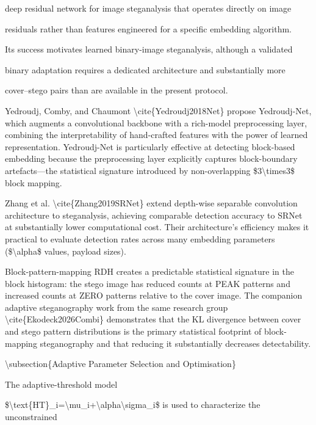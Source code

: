 \documentclass[a4paper,fleqn]{cas-dc}
\newenvironment{RevisionDeletion}{%
  \par\begingroup\color{revisionred}\footnotesize\ttfamily
  \setlength{\parindent}{0pt}\setlength{\parskip}{1pt}\obeyspaces
}{\par\endgroup}
\begin{document}
\begin{RevisionDeletion}
deep residual network for image steganalysis that operates directly on image\par
residuals rather than features engineered for a specific embedding algorithm.\par
Its success motivates learned binary-image steganalysis, although a validated\par
binary adaptation requires a dedicated architecture and substantially more\par
cover--stego pairs than are available in the present protocol.\par
\par
Yedroudj, Comby, and Chaumont \textbackslash{}cite\{Yedroudj2018Net\} propose Yedroudj-Net, which augments a convolutional backbone with a rich-model preprocessing layer, combining the interpretability of hand-crafted features with the power of learned representation. Yedroudj-Net is particularly effective at detecting block-based embedding because the preprocessing layer explicitly captures block-boundary artefacts---the statistical signature introduced by non-overlapping \$3\textbackslash{}times3\$ block mapping.\par
\par
Zhang et al. \textbackslash{}cite\{Zhang2019SRNet\} extend depth-wise separable convolution architecture to steganalysis, achieving comparable detection accuracy to SRNet at substantially lower computational cost. Their architecture's efficiency makes it practical to evaluate detection rates across many embedding parameters (\$\textbackslash{}alpha\$ values, payload sizes).\par
\par
Block-pattern-mapping RDH creates a predictable statistical signature in the block histogram: the stego image has reduced counts at PEAK patterns and increased counts at ZERO patterns relative to the cover image. The companion adaptive steganography work from the same research group \textbackslash{}cite\{Ekodeck2026Combi\} demonstrates that the KL divergence between cover and stego pattern distributions is the primary statistical footprint of block-mapping steganography and that reducing it substantially decreases detectability.\par
\par
\textbackslash{}subsection\{Adaptive Parameter Selection and Optimisation\}\par
\par
The adaptive-threshold model\par
\$\textbackslash{}text\{HT\}\_i=\textbackslash{}mu\_i+\textbackslash{}alpha\textbackslash{}sigma\_i\$ is used to characterize the unconstrained\par

\end{RevisionDeletion}
\end{document}
